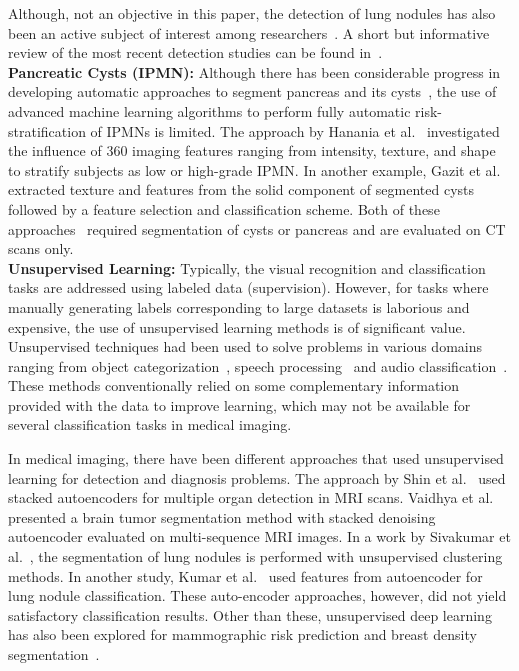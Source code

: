 \documentclass[journal]{IEEEtran}
\begin{document}
Although, not an objective in this paper, the detection of lung nodules has also been an active subject of interest among researchers~\cite{setio2016pulmonary,setio2017validation,khosravan2018s4nd}. A short but informative review of the most recent detection studies can be found in~\cite{khosravan2018s4nd}.\\ 

\noindent\textbf{Pancreatic Cysts (IPMN):} Although there has been considerable progress in developing automatic approaches to segment pancreas and its cysts~\cite{zhou2017deep,cai2016pancreas}, the use of advanced machine learning algorithms to perform fully automatic risk-stratification of IPMNs is limited. The approach by Hanania et al.~\cite{hanania2016quantitative} investigated the influence of 360 imaging features ranging from intensity, texture, and shape to stratify subjects as low or high-grade IPMN. In another example, Gazit et al.~\cite{gazit2017quantification} extracted texture and features from the solid component of segmented cysts followed by a feature selection and classification scheme. Both of these approaches~\cite{hanania2016quantitative,gazit2017quantification} required segmentation of cysts or pancreas and are evaluated on CT scans only.\\

\noindent\textbf{Unsupervised Learning:} Typically, the visual recognition and classification tasks are addressed using labeled data (supervision). However, for tasks where manually generating labels corresponding to large datasets is laborious and expensive, the use of unsupervised learning methods is of significant value. Unsupervised techniques had been used to solve problems in various domains ranging from object categorization~\cite{sivic2005discovering}, speech processing~\cite{kamper2015fully} and audio classification~\cite{lee2009unsupervised}. These methods conventionally relied on some complementary information provided with the data to improve learning, which may not be available for several classification tasks in medical imaging.

In medical imaging, there have been different approaches that used unsupervised learning for detection and diagnosis problems. The approach by Shin et al.~\cite{shin2013stacked} used stacked autoencoders for multiple organ detection in MRI scans. Vaidhya et al.~\cite{vaidhya2015multi} presented a brain tumor segmentation method with stacked denoising autoencoder evaluated on multi-sequence MRI images. In a work by Sivakumar et al.~\cite{sivakumar2012lung}, the segmentation of lung nodules is performed with unsupervised clustering methods. In another study, Kumar et al.~\cite{kumar2015lung} used features from autoencoder for lung nodule classification. These auto-encoder approaches, however, did not yield satisfactory classification results. Other than these, unsupervised deep learning has also been explored for mammographic risk prediction and breast density segmentation~\cite{kallenberg2016unsupervised}.
\end{document}
